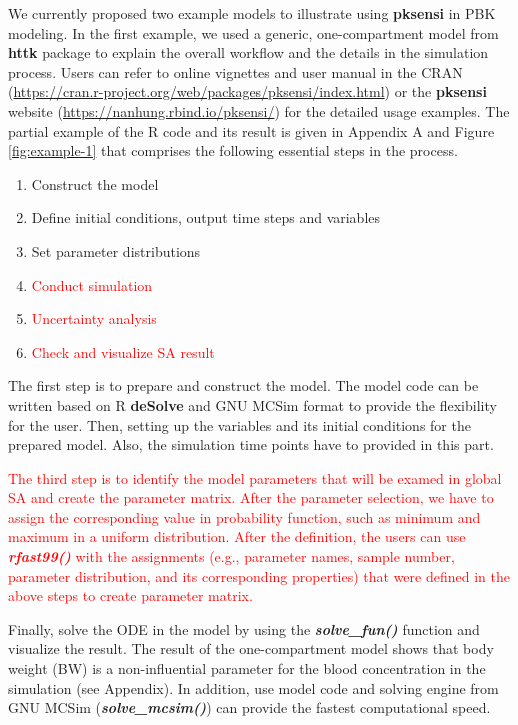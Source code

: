 \documentclass[preprint,12pt, a4paper]{elsarticle}
\begin{document}
We currently proposed two example models to illustrate using \textbf{pksensi} in PBK modeling. In the first example, we used a generic, one-compartment model from \textbf{httk} package \cite{JSSv079i04} to explain the overall workflow and the details in the simulation process. Users can refer to online vignettes and user manual in the CRAN (\url{https://cran.r-project.org/web/packages/pksensi/index.html}) or the \textbf{pksensi} website (\url{https://nanhung.rbind.io/pksensi/}) for the detailed usage examples. The partial example of the R code and its result is given in Appendix A and Figure \ref{fig:example-1} that comprises the following essential steps in the process.

\begin{enumerate}
  \item Construct the model
  \item Define initial conditions, output time steps and variables
  \item Set parameter distributions
  \item \textcolor{red}{Conduct simulation}
  \item \textcolor{red}{Uncertainty analysis}
  \item \textcolor{red}{Check and visualize SA result}
\end{enumerate}

The first step is to prepare and construct the model. The model code can be written based on R \textbf{deSolve} and GNU MCSim format to provide the flexibility for the user. Then, setting up the variables and its initial conditions for the prepared model. Also, the simulation time points have to provided in this part.

\textcolor{red}{The third step is to identify the model parameters that will be examed in global SA and create the parameter matrix. After the parameter selection, we have to assign the corresponding value in probability function, such as minimum and maximum in a uniform distribution. After the definition, the users can use \textit{\textbf{rfast99()}} with the assignments (e.g., parameter names, sample number, parameter distribution, and its corresponding properties) that were defined in the above steps to create parameter matrix.}

Finally, solve the ODE in the model by using the \textit{\textbf{solve\_fun()}} function and visualize the result. The result of the one-compartment model shows that body weight (BW) is a non-influential parameter for the blood concentration in the simulation (see Appendix). In addition, use model code and solving engine from GNU MCSim (\textit{\textbf{solve\_mcsim()}}) can provide the fastest computational speed.
\end{document}
